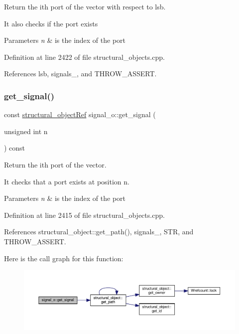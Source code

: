 Return the ith port of the vector with respect to lsb. 

It also checks if the port exists 
\begin{DoxyParams}{Parameters}
{\em n} & is the index of the port \\
\hline
\end{DoxyParams}


Definition at line 2422 of file structural\+\_\+objects.\+cpp.



References lsb, signals\+\_\+, and T\+H\+R\+O\+W\+\_\+\+A\+S\+S\+E\+RT.

\mbox{\label{classsignal__o_a66328704e54e93748a068487c72e2ba9}} 
\subsubsection{\texorpdfstring{get\+\_\+signal()}{get\_signal()}}
{\footnotesize\ttfamily const \hyperlink{structural__objects_8hpp_a8ea5f8cc50ab8f4c31e2751074ff60b2}{structural\+\_\+object\+Ref} signal\+\_\+o\+::get\+\_\+signal (\begin{DoxyParamCaption}\item[{unsigned int}]{n }\end{DoxyParamCaption}) const}



Return the ith port of the vector. 

It checks that a port exists at position n. 
\begin{DoxyParams}{Parameters}
{\em n} & is the index of the port \\
\hline
\end{DoxyParams}


Definition at line 2415 of file structural\+\_\+objects.\+cpp.



References structural\+\_\+object\+::get\+\_\+path(), signals\+\_\+, S\+TR, and T\+H\+R\+O\+W\+\_\+\+A\+S\+S\+E\+RT.

Here is the call graph for this function\+:
\nopagebreak
\begin{figure}[H]
\begin{center}
\leavevmode
\includegraphics[width=350pt]{db/d5c/classsignal__o_a66328704e54e93748a068487c72e2ba9_cgraph}
\end{center}
\end{figure}
\mbox{\label{classsignal__o_a56252b61b675df237d5b7bca998a345a}} 
